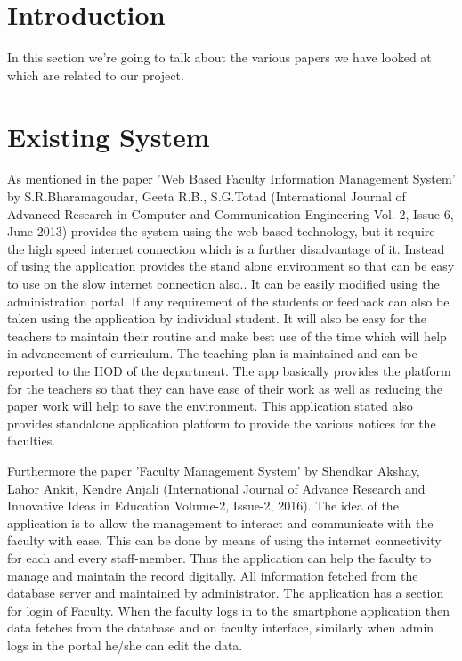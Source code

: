 \documentclass[BTech]{srmuthesis}
\begin{document}
\section{Introduction}
In this section we're going to talk about the various papers we have looked at which are related to our project.
\section{Existing System}
As mentioned in the paper 'Web Based Faculty Information Management System' by
S.R.Bharamagoudar, Geeta R.B., S.G.Totad (International Journal of Advanced Research in
Computer and Communication Engineering Vol. 2, Issue 6, June 2013) \cite{einstein}provides the system
using the web based technology, but it require the high speed internet connection which is a
further disadvantage of it. Instead of using the application provides the stand alone
environment so that can be easy to use on the slow internet connection also.. It can be easily
modified using the administration portal. If any requirement of the students or feedback can
also be taken using the application by individual student. It will also be easy for the teachers to
maintain their routine and make best use of the time which will help in advancement of
curriculum. The teaching plan is maintained and can be reported to the HOD of the
department. The app basically provides the platform for the teachers so that they can have
ease of their work as well as reducing the paper work will help to save the environment. This
application stated also provides standalone application platform to provide the various notices for the faculties.

Furthermore the paper 'Faculty Management System' by Shendkar Akshay, Lahor Ankit,
Kendre Anjali (International Journal of Advance Research and Innovative Ideas in
Education Volume-2, Issue-2, 2016).\cite{einstein1} The idea of the application is to allow the management
to interact and communicate with the faculty with ease. This can be done by means of using the internet connectivity for each and every staff-member. Thus the application can help the
faculty to manage and maintain the record digitally. All information fetched from the database server and maintained by administrator. The application has a section for login of Faculty. When the faculty logs in to the smartphone application then data fetches from the database and on faculty interface, similarly when admin logs in the portal he/she can edit the data.
\end{document}

